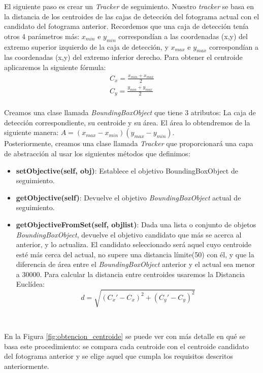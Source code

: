 El siguiente paso es crear un \textit{Tracker} de seguimiento. Nuestro \textit{tracker} se basa en la distancia de los centroides de las cajas de detección del fotograma actual con el candidato del fotograma anterior. Recordemos que una caja de detección tenía otros 4 parámetros más: $x_{min}$ e $y_{min}$ correspondían a las coordenadas (x,y) del extremo superior izquierdo de la caja de detección, y $x_{max}$ e $y_{max}$ correspondían a las coordenadas (x,y) del extremo inferior derecho. Para obtener el centroide aplicaremos la siguiente fórmula:\\
\begin{eqnarray*}
C_x = \frac{x_{min} + x_{max}}{2}\\
C_y = \frac{y_{min} + y_{max}}{2}\\
\end{eqnarray*}

Creamos una clase llamada \textit{BoundingBoxObject} que tiene 3 atributos: La caja de detección correspondiente, su centroide y su área. El área lo obtendremos de la siguiente manera: $A = (x_{max} - x_{min}) (y_{max} - y_{min})$.\\

Posteriormente, creamos una clase llamada \textit{Tracker} que proporcionará una capa de abstracción al usar los siguientes métodos que definimos:

\begin{itemize}
	\item \textbf{setObjective(self, obj)}: Establece el objetivo BoundingBoxObject de seguimiento.
	\item \textbf{getObjective(self)}: Devuelve el objetivo \textit{BoundingBoxObject} actual de seguimiento.
	\item \textbf{getObjectiveFromSet(self, objlist)}: Dada una lista o conjunto de objetos \textit{BoundingBoxObject}, devuelve el objetivo candidato que más se acerca al anterior, y lo actualiza. El candidato seleccionado será aquel cuyo centroide esté más cerca del actual, no supere una distancia límite(50) con él, y que la diferencia de área entre el \textit{BoundingBoxObject} anterior y el actual sea menor a 30000. Para calcular la distancia entre centroides usaremos la Distancia Euclídea:
	\begin{equation*}
	d = \sqrt{(C_{x}' - C_{x})^2 + (C_{y}' - C_{y})^2}
	\end{equation*}
\end{itemize}\

En la Figura \ref{fig:obtencion_centroide} se puede ver con más detalle en qué se basa este procedimiento: se compara cada centroide con el centroide candidato del fotograma anterior y se elige aquel que cumpla los requisitos descritos anteriormente.\\

